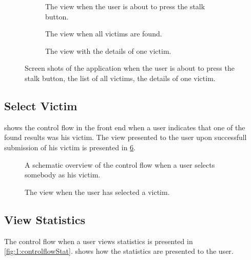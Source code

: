 		\begin{figure}
			\begin{subfigure}{\textwidth}
				\caption{The view when the user is about to press the stalk button.}
				\label{fig:1:viewStalk:startStalk}
			\end{subfigure}
			\begin{subfigure}{\textwidth}
				\caption{The view when all victims are found.}
				\label{fig:1:viewStalk:allVictims}
			\end{subfigure}		
			\begin{subfigure}{\textwidth}
				\caption{The view with the details of one victim.}
				\label{fig:1:viewStalk:oneVictim}
			\end{subfigure}						
			
			\caption{Screen shots of the application when  the user is about to press the stalk button,  the list of all victims,  the details of one victim.}
			\label{fig:1:viewStalk}
		\end{figure}

\subsection{Select Victim}
	 shows the control flow in the front end when a user indicates that one of the found results was his victim. The view presented to the user upon successfull submission of his victim is presented in \cref{fig:1:viewVictim:selectedVictim}.

		\begin{figure}
			\caption{A schematic overview of the control flow when a user selects somebody as his victim.}
			\label{fig:1:controlflowVictim}
		\end{figure}	

		\begin{figure}
				\caption{The view when the user has selected a victim.}
				\label{fig:1:viewVictim:selectedVictim}
		\end{figure}	

\subsection{View Statistics}
	The control flow when a user views statistics is presented in \cref{fig:1:controlflowStat}.  shows how the statistics are presented to the user.

